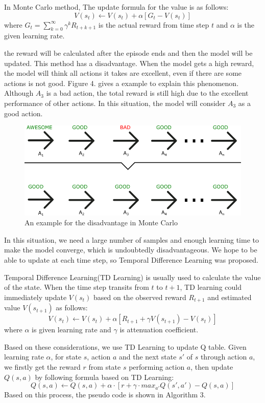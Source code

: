 In Monte Carlo method, The update formula for the value is as follows:
$$
V(s_t) \leftarrow V(s_t)+\alpha \left[ G_t-V(s_t) \right]
$$
where $G_t=\sum_{k=0}^\infty \gamma^k R_{t+k+1}$ is the actual reward from time step $t$ and $\alpha$ is the given learning rate.

the reward will be calculated after the episode ends and then the model will be updated. This method has a disadvantage. When the model gets a high reward, the model will think all actions it takes are excellent, even if there are some actions is not good. Figure 4. gives a example to explain this phenomenon. Although $A_3$ is a bad action, the total reward is still high due to the excellent performance of other actions. In this situation, the model will consider $A_3$ as a good action. 

\begin{figure}
    \centering
    \includegraphics[width=\linewidth]{../Figures/bad_example_MC.png}
    \caption{An example for the disadvantage in Monte Carlo}
\end{figure}

In this situation, we need a large number of samples and enough learning time to make the model converge, which is undoubtedly disadvantageous. We hope to be able to update at each time step, so Temporal Difference Learning was proposed.

Temporal Difference Learning(TD Learning) is usually used to calculate the value of the state. When the time step transits from $t$ to $t+1$, TD learning could immediately update $V(s_t)$ based on the observed reward $R_{t+1}$ and estimated value $V(s_{t+1})$ as follows:
$$
V(s_t) \leftarrow V(s_t)+\alpha \left[ R_{t+1}+\gamma V(s_{t+1})-V(s_t) \right]
$$
where $\alpha$ is given learning rate and $\gamma$ is attenuation coefficient.

Based on these considerations, we use TD Learning to update Q table. Given learning rate $\alpha$, for state $s$, action $a$ and the next state $s'$ of $s$ through action $a$, we firstly get the reward $r$ from state $s$ performing action $a$, then update $Q(s,a)$ by following formula based on TD Learning:
$$
Q(s,a)\leftarrow Q(s,a)+\alpha \cdot [r+\gamma \cdot max_{a'}Q(s',a')-Q(s,a)]
$$
Based on this process, the pseudo code is shown in Algorithm 3.


